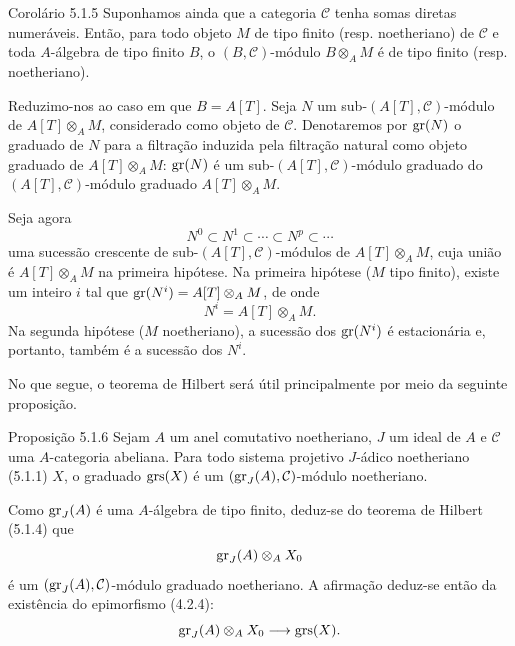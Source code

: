 \begin{statement}{Corolário 5.1.5}
Suponhamos ainda que a categoria \(\mathcal C\) tenha somas diretas numeráveis. Então, para todo objeto \(M\) de tipo finito (resp. noetheriano) de \(\mathcal C\) e toda \(A\)-álgebra de tipo finito \(B\), o \((B,\mathcal C)\)-módulo \(B\otimes_A M\) é de tipo finito (resp. noetheriano).
\end{statement}

\begin{prooftext}
Reduzimo-nos ao caso em que \(B=A[T]\). Seja \(N\) um sub-\((A[T],\mathcal C)\)-módulo de \(A[T]\otimes_A M\), considerado como objeto de \(\mathcal C\). Denotaremos por \(\operatorname{gr}(N)\) o graduado de \(N\) para a filtração induzida pela filtração natural como objeto graduado de \(A[T]\otimes_A M\): \(\operatorname{gr}(N)\) é um sub-\((A[T],\mathcal C)\)-módulo graduado do \((A[T],\mathcal C)\)-módulo graduado \(A[T]\otimes_A M\).

Seja agora
\[
N^0\subset N^1\subset\cdots\subset N^p\subset\cdots
\]
uma sucessão crescente de sub-\((A[T],\mathcal C)\)-módulos de \(A[T]\otimes_A M\), cuja união é \(A[T]\otimes_A M\) na primeira hipótese. Na primeira hipótese (\(M\) tipo finito), existe um inteiro \(i\) tal que \(\operatorname{gr}(N^i)=A[T]\otimes_A M\), de onde
\[
N^i=A[T]\otimes_A M.
\]
Na segunda hipótese (\(M\) noetheriano), a sucessão dos \(\operatorname{gr}(N^i)\) é estacionária e, portanto, também é a sucessão dos \(N^i\).

No que segue, o teorema de Hilbert será útil principalmente por meio da seguinte proposição.
\end{prooftext}

\begin{statement}{Proposição 5.1.6}
Sejam \(A\) um anel comutativo noetheriano, \(J\) um ideal de \(A\) e \(\mathcal C\) uma \(A\)-categoria abeliana. Para todo sistema projetivo \(J\)-ádico noetheriano (5.1.1) \(X\), o graduado \(\operatorname{grs}(X)\) é um \((\operatorname{gr}_J(A),\mathcal C)\)-módulo noetheriano.
\end{statement}

\begin{prooftext}
Como \(\operatorname{gr}_J(A)\) é uma \(A\)-álgebra de tipo finito, deduz-se do teorema de Hilbert (5.1.4) que
\[
\operatorname{gr}_J(A)\otimes_A X_0
\]
é um \((\operatorname{gr}_J(A),\mathcal C)\)-módulo graduado noetheriano. A afirmação deduz-se então da existência do epimorfismo (4.2.4):
\[
\operatorname{gr}_J(A)\otimes_A X_0\longrightarrow \operatorname{grs}(X).
\]
\end{prooftext}
